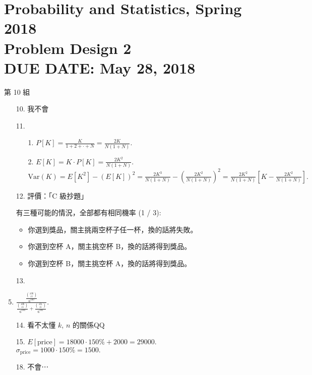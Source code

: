 \documentclass{article}
\newcommand{\hmwkClass}{Probability and Statistics, Spring 2018}
\newcommand{\hmwkTitle}{Problem Design 2}
\newcommand{\hmwkDueDate}{May 28, 2018}
\begin{document}
\thispagestyle{empty}
\section*{\hmwkClass \\
    \normalsize{\hmwkTitle} \\
    \normalsize{DUE DATE: \hmwkDueDate}
}

\hfill{第 10 組}





\begin{enumerate}
    \item [10.] 我不會
    \item [11.] 
    
        \begin{enumerate}
            \item [1.] $P[K] = \frac{K}{1 + 2 + \cdot + N} = \frac{2K}{N(1 + N)}.$
            \item [2.] $E[K] = K \cdot P[K] = \frac{2K^2}{N(1 + N)}.$ \\
                       $\text{Var}(K) = E[K^2] - (E[K])^2 = \frac{2K^3}{N(1 + N)} - (\frac{2K^2}{N(1 + N)})^2 = \frac{2K^2}{N(1 + N)}[K - \frac{2K^2}{N(1 + N)}].$ 
        \end{enumerate}

    \item [12.] 評價：「C 級抄題」

    有三種可能的情況，全部都有相同機率 (1 / 3):

    \begin{itemize}
        \item 你選到獎品，關主挑兩空杯子任一杯，換的話將失敗。
        \item 你選到空杯 A，關主挑空杯 B，換的話將得到獎品。
        \item 你選到空杯 B，關主挑空杯 A，換的話將得到獎品。
    \end{itemize}
        
    \item [13.]

    \item $\frac{\frac{\binom{100}{15}}{6^{100}}}{\frac{\binom{100}{15}}{6^{100}} + \frac{\binom{101}{15}}{6^{101}}}.$

    \item [14.] 看不太懂 $k$, $n$ 的關係QQ

    \item [15.] $E[\text{price}] = 18000 \cdot 150\% + 2000 = 29000.$ \\
                $\sigma_{\text{price}} = 1000 \cdot 150\% = 1500.$

    \item [18.] 不會⋯


\end{enumerate}
\end{document}
